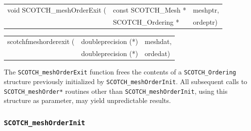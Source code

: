 \begin{itemize}
\progsyn

{\tt\begin{tabular}{l@{}ll}
void SCOTCH\_meshOrderExit ( & const SCOTCH\_Mesh * & meshptr, \\
                             & SCOTCH\_Ordering *   & ordeptr)
\end{tabular}}

{\tt\begin{tabular}{l@{}ll}
scotchfmeshorderexit ( & doubleprecision (*) & meshdat, \\
                       & doubleprecision (*) & ordedat)
\end{tabular}}

\progdes

The {\tt SCOTCH\_meshOrderExit} function frees the contents of a
{\tt SCOTCH\_\lbt Ordering} structure previously initialized by
{\tt SCOTCH\_\lbt mesh\lbt Order\lbt Init}. All subsequent calls to
{\tt SCOTCH\_\lbt mesh\lbt Order*} routines other than
{\tt SCOTCH\_\lbt mesh\lbt Order\lbt Init}, using this structure
as parameter, may yield unpredictable results.
\end{itemize}

\subsubsection{{\tt SCOTCH\_meshOrderInit}}
\label{sec-lib-mesh-order-init}

